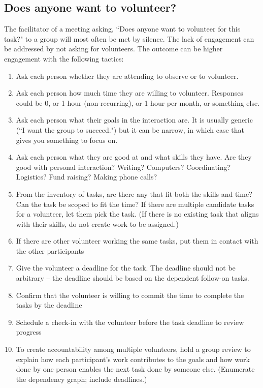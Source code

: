 \subsection{Does anyone want to volunteer?}


The facilitator of a meeting asking, ``Does anyone want to volunteer for this task?" to a group will most often be met by silence. 
The lack of engagement can be addressed by not asking for volunteers. The outcome can be higher engagement with the following tactics:
\begin{enumerate}
    \item Ask each person whether they are attending to observe or to volunteer.
    \item Ask each person how much time they are willing to volunteer. Responses could be 0, or 1 hour (non-recurring), or 1 hour per month, or something else.
    \item Ask each person what their goals in the interaction are. It is usually generic (``I want the group to succeed.") but it can be narrow, in which case that gives you something to focus on.
    \item Ask each person what they are good at and what skills they have. Are they good with personal interaction? Writing? Computers? Coordinating? Logistics? Fund raising? Making phone calls?
    \item From the inventory of tasks, are there any that fit both the skills and time? Can the task be scoped to fit the time? If there are multiple candidate tasks for a volunteer, let them pick the task. (If there is no existing task that aligns with their skills, do not create work to be assigned.)
    \item If there are other volunteer working the same tasks, put them in contact with the other participants
    \item Give the volunteer a deadline for the task. The deadline should not be arbitrary -- the deadline should be based on the dependent follow-on tasks. 
    \item Confirm that the volunteer is willing to commit the time to complete the tasks by the deadline
    \item Schedule a check-in with the volunteer before the task deadline to review progress
    \item To create accountability among multiple volunteers, hold a group review to explain how each participant's work contributes to the goals and how work done by one person enables the next task done by someone else. (Enumerate the dependency graph; include deadlines.)
\end{enumerate}
